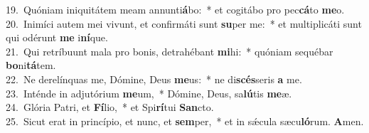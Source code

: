 {19.~}Quóniam iniquitátem meam annunti\textbf{á}bo:~* et cogitábo pro pec\textbf{cá}to \textbf{me}o.\\
{20.~}Inimíci autem mei vivunt, et confirmáti sunt \textbf{su}per me:~* et multiplicáti sunt qui odérunt \textbf{me} i\textbf{ní}que.\\
{21.~}Qui retríbuunt mala pro bonis, detrahébant \textbf{mi}hi:~* quóniam sequébar \textbf{bo}ni\textbf{tá}tem.\\
{22.~}Ne derelínquas me, Dómine, Deus \textbf{me}us:~* ne di\textbf{scés}seris \textbf{a} me.\\
{23.~}Inténde in adjutórium \textbf{me}um,~* Dómine, Deus, sa\textbf{lú}tis \textbf{me}æ.\\
{24.~}Glória Patri, et \textbf{Fí}lio,~* et Spi\textbf{rí}tui \textbf{San}cto.\\
{25.~}Sicut erat in princípio, et nunc, et \textbf{sem}per,~* et in sǽcula sæcu\textbf{ló}rum. \textbf{A}men.\\
